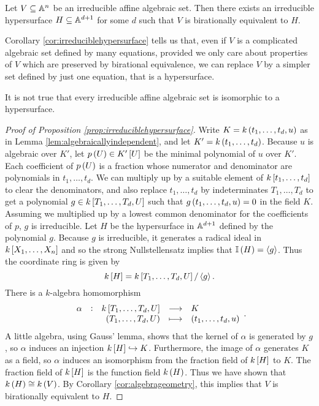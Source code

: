 \begin{corollary}
\label{cor:irreduciblehypersurface}
Let $ V \subseteq \AA^n $ be an irreducible affine algebraic set. Then there exists an irreducible hypersurface $ H \subseteq \AA^{d + 1} $ for some $ d $ such that $ V $ is birationally equivalent to $ H $.
\end{corollary}

Corollary \ref{cor:irreduciblehypersurface} tells us that, even if $ V $ is a complicated algebraic set defined by many equations, provided we only care about properties of $ V $ which are preserved by birational equivalence, we can replace $ V $ by a simpler set defined by just one equation, that is a hypersurface.

\begin{note*}
It is not true that every irreducible affine algebraic set is isomorphic to a hypersurface.
\end{note*}

\begin{proof}[Proof of Proposition \ref{prop:irreduciblehypersurface}]
Write $ K = k\br{t_1, \dots, t_d, u} $ as in Lemma \ref{lem:algebraicallyindependent}, and let $ K' = k\br{t_1, \dots, t_d} $. Because $ u $ is algebraic over $ K' $, let $ p\br{U} \in K'\sbr{U} $ be the minimal polynomial of $ u $ over $ K' $. Each coefficient of $ p\br{U} $ is a fraction whose numerator and denominator are polynomials in $ t_1, \dots, t_d $. We can multiply up by a suitable element of $ k\sbr{t_1, \dots, t_d} $ to clear the denominators, and also replace $ t_1, \dots, t_d $ by indeterminates $ T_1, \dots, T_d $ to get a polynomial $ g \in k\sbr{T_1, \dots, T_d, U} $ such that $ g\br{t_1, \dots, t_d, u} = 0 $ in the field $ K $. Assuming we multiplied up by a lowest common denominator for the coefficients of $ p $, $ g $ is irreducible. Let $ H $ be the hypersurface in $ \AA^{d + 1} $ defined by the polynomial $ g $. Because $ g $ is irreducible, it generates a radical ideal in $ k\sbr{X_1, \dots, X_n} $ and so the strong Nullstellensatz implies that $ \II\br{H} = \abr{g} $. Thus the coordinate ring is given by
$$ k\sbr{H} = k\sbr{T_1, \dots, T_d, U} / \abr{g}. $$
There is a $ k $-algebra homomorphism
$$ \function[\alpha]{k\sbr{T_1, \dots, T_d, U}}{K}{\br{T_1, \dots, T_d, U}}{\br{t_1, \dots, t_d, u}}. $$
A little algebra, using Gauss' lemma, shows that the kernel of $ \alpha $ is generated by $ g $, so $ \alpha $ induces an injection $ k\sbr{H} \hookrightarrow K $. Furthermore, the image of $ \alpha $ generates $ K $ as a field, so $ \alpha $ induces an isomorphism from the fraction field of $ k\sbr{H} $ to $ K $. The fraction field of $ k\sbr{H} $ is the function field $ k\br{H} $. Thus we have shown that $ k\br{H} \cong k\br{V} $. By Corollary \ref{cor:algebrageometry}, this implies that $ V $ is birationally equivalent to $ H $.
\end{proof}

